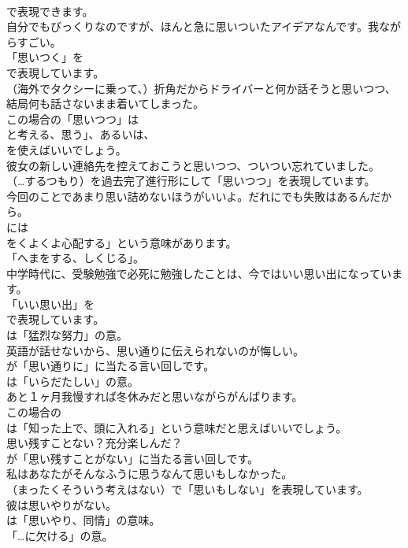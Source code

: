 \documentclass[8pt]{extreport}
\begin{document}
\begin{CJK}{UTF8}{min}
\\	で表現できます。	
\\	自分でもびっくりなのですが、ほんと急に思いついたアイデアなんです。我ながらすごい。 
\\	「思いつく」を 
\\	で表現しています。	
\\	（海外でタクシーに乗って、）折角だからドライバーと何か話そうと思いつつ、結局何も話さないまま着いてしまった。 
\\	この場合の「思いつつ」は
\\	と考える、思う」、あるいは、
\\	を使えばいいでしょう。	
\\	彼女の新しい連絡先を控えておこうと思いつつ、ついつい忘れていました。 
\\	（…するつもり）を過去完了進行形にして「思いつつ」を表現しています。	
\\	今回のことであまり思い詰めないほうがいいよ。だれにでも失敗はあるんだから。 
\\	には
\\	をくよくよ心配する」という意味があります。
\\	「へまをする、しくじる」。	
\\	中学時代に、受験勉強で必死に勉強したことは、今ではいい思い出になっています。 
\\	「いい思い出」を 
\\	で表現しています。
\\	は「猛烈な努力」の意。	
\\	英語が話せないから、思い通りに伝えられないのが悔しい。 
\\	が「思い通りに」に当たる言い回しです。
\\	は「いらだたしい」の意。	
\\	あと１ヶ月我慢すれば冬休みだと思いながらがんばります。 
\\	この場合の
\\	は「知った上で、頭に入れる」という意味だと思えばいいでしょう。	
\\	思い残すことない？充分楽しんだ？ 
\\	が「思い残すことがない」に当たる言い回しです。	
\\	私はあなたがそんなふうに思うなんて思いもしなかった。 
\\	（まったくそういう考えはない）で「思いもしない」を表現しています。	
\\	彼は思いやりがない。 
\\	は「思いやり、同情」の意味。
\\	「…に欠ける」の意。	

\end{CJK}
\end{document}
